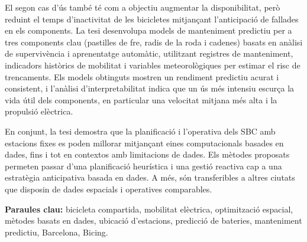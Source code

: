 \begin{catalanabstract}
El segon cas d'ús també té com a objectiu augmentar la disponibilitat, però reduint el temps d'inactivitat de les bicicletes mitjançant l'anticipació de fallades en els components. La tesi desenvolupa models de manteniment predictiu per a tres components clau (pastilles de fre, radis de la roda i cadenes) basats en anàlisi de supervivència i aprenentatge automàtic, utilitzant registres de manteniment, indicadors històrics de mobilitat i variables meteorològiques per estimar el risc de trencaments. Els models obtinguts mostren un rendiment predictiu acurat i consistent, i l'anàlisi d'interpretabilitat indica que un ús més intensiu escurça la vida útil dels components, en particular una velocitat mitjana més alta i la propulsió elèctrica.

En conjunt, la tesi demostra que la planificació i l'operativa dels SBC amb estacions fixes es poden millorar mitjançant eines computacionals basades en dades, fins i tot en contextos amb limitacions de dades. Els mètodes proposats permeten passar d'una planificació heurística i una gestió reactiva cap a una estratègia anticipativa basada en dades. A més, són transferibles a altres ciutats que disposin de dades espacials i operatives comparables.

  \textbf{Paraules clau:} bicicleta compartida, mobilitat elèctrica, optimització espacial, mètodes basats en dades, ubicació d’estacions, predicció de bateries, manteniment predictiu, Barcelona, Bicing.

\end{catalanabstract}
